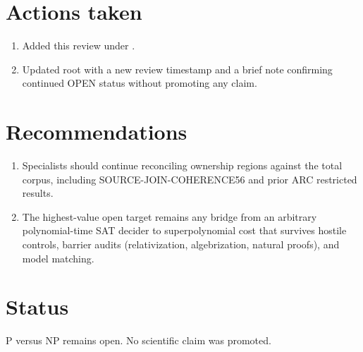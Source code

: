 \documentclass[11pt]{article}
\begin{document}
\section{Actions taken}
\begin{enumerate}
\item Added this review under .
\item Updated root  with a new review timestamp and a brief note confirming continued OPEN status without promoting any claim.
\end{enumerate}

\section{Recommendations}
\begin{enumerate}
\item Specialists should continue reconciling ownership regions against the total corpus, including SOURCE-JOIN-COHERENCE56 and prior ARC restricted results.
\item The highest-value open target remains any bridge from an arbitrary polynomial-time SAT decider to superpolynomial cost that survives hostile controls, barrier audits (relativization, algebrization, natural proofs), and model matching.
\end{enumerate}

\section{Status}
P versus NP remains open. No scientific claim was promoted.

\end{document}
